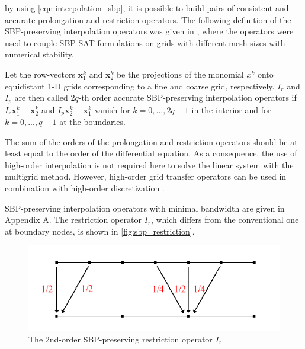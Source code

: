by using \autoref{eqn:interpolation_sbp}, it is possible to build pairs of consistent and accurate prolongation and restriction operators. The following definition of the SBP-preserving interpolation operators was given in \cite{RUGGIU2018216}, where the operators were used to couple SBP-SAT formulations on grids with different mesh sizes with numerical stability.



\begin{definition}
  Let the row-vectors $\mathbf{x}_1^k$ and $\mathbf{x}_2^k$ be the projections of the monomial $x^k$ onto equidistant 1-D grids corresponding to a fine and coarse grid, respectively. $I_r$ and $I_p$ are then called 2$q$-th order accurate SBP-preserving interpolation operators if $I_r\mathbf{x}_1^k - \mathbf{x}_2^k$ and $I_p\mathbf{x}_2^k - \mathbf{x}_1^k$ vanish for $k = 0, ...,2q-1$ in the interior and for $k=0,...,q-1$ at the boundaries.
\end{definition}


The sum of the orders of the prolongation and restriction operators should be at least equal to the order of the differential equation. As a consequence, the use of high-order interpolation is not required here to solve the linear system with the multigrid method. However, high-order grid transfer operators can be used in combination with high-order discretization \cite{sundar2015comparison}. 

SBP-preserving interpolation operators with minimal bandwidth are given in Appendix A. The restriction operator $I_r$, which differs from the conventional one at boundary nodes, is shown in \autoref{fig:sbp_restriction}.


\begin{figure}
    \centering
    \includegraphics{figures/sbp_restriction.png}
    \centering
    \caption{The 2nd-order SBP-preserving restriction operator $I_r$}
    \label{fig:sbp_restriction}
\end{figure}




